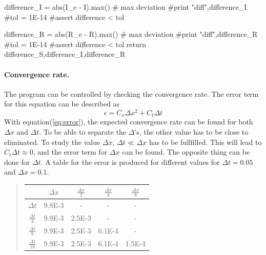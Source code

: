 \documentclass[%
twoside,                 %
final,                   %
10pt]{article}
\begin{document}
    difference_I = abs(I_e - I).max()  # max deviation
    #print "diff",difference_I
    #tol = 1E-14
    #assert difference < tol
   
    difference_R = abs(R_e - R).max()  # max deviation
    #print "diff",difference_R
    #tol = 1E-14
    #assert difference < tol
    return difference_S,difference_I,difference_R
\epycod

\paragraph{Convergence rate.}
The program can be controlled by checking the convergence rate. The error term  for this equation can be described as  
\begin{equation} \label{eq:error}
    \epsilon = C_x\Delta x^2 + C_t \Delta t
\end{equation}
With equation(\ref{eq:error}), the expected convergence rate can be found for both $\Delta x$ and $\Delta t$. To be able to separate the $\Delta$'s, the other value has to be close to eliminated. To study the value $\Delta x$,  $\Delta t \ll \Delta x$ has to be fullfilled. This will lead to $C_t\Delta t \approx 0$, and the error term for $\Delta x$ can be found. The opposite thing can  be done for $\Delta t$. A table for the error is produced for different values for $\Delta t = 0.05$ and $\Delta x=0.1$.

\label{table:error_numbers}

\begin{quote}
\begin{tabular}{ccccc}
\hline
\multicolumn{1}{c}{  } & \multicolumn{1}{c}{ $\Delta x$ } & \multicolumn{1}{c}{ $\frac{\Delta x}{2}$ } & \multicolumn{1}{c}{ $\frac{\Delta x}{4}$ } & \multicolumn{1}{c}{ $\frac{\Delta x}{8}$ } \\
\hline
$\Delta t     $       & 9.8E-3                & -                     & -                     & -                     \\
$\frac{\Delta t}{4} $ & 9.9E-3                & 2.5E-3                & -                     & -                     \\
$\frac{\Delta t}{8} $ & 9.9E-3                & 2.5E-3                & 6.1E-4                & -                     \\
$\frac{\Delta t}{16}$ & 9.9E-3                & 2.5E-3                & 6.1E-4                & 1.5E-4                \\
\hline
\end{tabular}
\end{quote}
\end{document}
